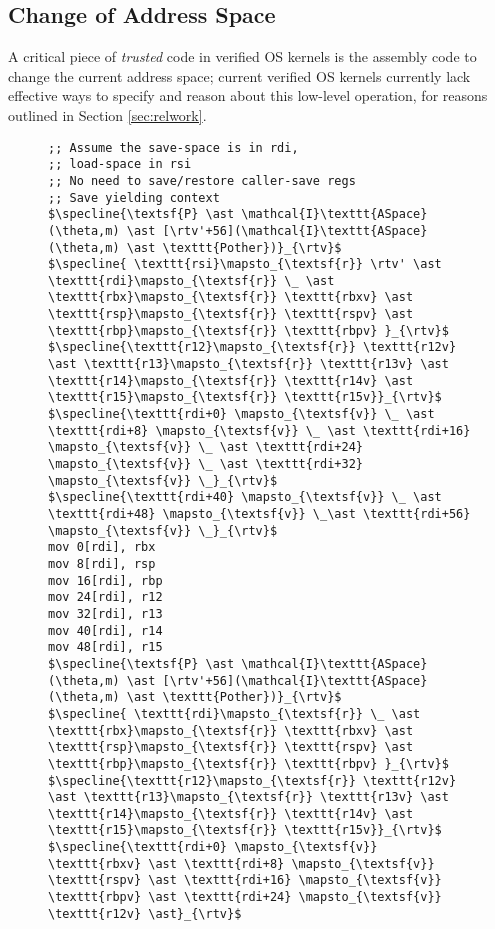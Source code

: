 \subsection{Change of Address Space}
A critical piece of \emph{trusted} code in verified OS kernels is the assembly code to change the current address space; current verified OS kernels currently lack effective ways to specify and reason about this low-level operation, for reasons outlined in Section \ref{sec:relwork}.
\begin{figure}\footnotesize
\begin{lstlisting}[mathescape]
;; Assume the save-space is in rdi,
;; load-space in rsi
;; No need to save/restore caller-save regs
;; Save yielding context
$\specline{\textsf{P} \ast \mathcal{I}\texttt{ASpace}(\theta,m) \ast [\rtv'+56](\mathcal{I}\texttt{ASpace}(\theta,m) \ast \texttt{Pother})}_{\rtv}$
$\specline{ \texttt{rsi}\mapsto_{\textsf{r}} \rtv' \ast \texttt{rdi}\mapsto_{\textsf{r}} \_ \ast \texttt{rbx}\mapsto_{\textsf{r}} \texttt{rbxv} \ast  \texttt{rsp}\mapsto_{\textsf{r}} \texttt{rspv} \ast \texttt{rbp}\mapsto_{\textsf{r}} \texttt{rbpv} }_{\rtv}$
$\specline{\texttt{r12}\mapsto_{\textsf{r}} \texttt{r12v} \ast \texttt{r13}\mapsto_{\textsf{r}} \texttt{r13v} \ast \texttt{r14}\mapsto_{\textsf{r}} \texttt{r14v} \ast \texttt{r15}\mapsto_{\textsf{r}} \texttt{r15v}}_{\rtv}$
$\specline{\texttt{rdi+0} \mapsto_{\textsf{v}} \_ \ast \texttt{rdi+8} \mapsto_{\textsf{v}} \_ \ast \texttt{rdi+16} \mapsto_{\textsf{v}} \_ \ast \texttt{rdi+24} \mapsto_{\textsf{v}} \_ \ast \texttt{rdi+32} \mapsto_{\textsf{v}} \_}_{\rtv}$
$\specline{\texttt{rdi+40} \mapsto_{\textsf{v}} \_ \ast \texttt{rdi+48} \mapsto_{\textsf{v}} \_\ast \texttt{rdi+56} \mapsto_{\textsf{v}} \_}_{\rtv}$
mov 0[rdi], rbx
mov 8[rdi], rsp
mov 16[rdi], rbp
mov 24[rdi], r12
mov 32[rdi], r13
mov 40[rdi], r14
mov 48[rdi], r15
$\specline{\textsf{P} \ast \mathcal{I}\texttt{ASpace}(\theta,m) \ast [\rtv'+56](\mathcal{I}\texttt{ASpace}(\theta,m) \ast \texttt{Pother})}_{\rtv}$
$\specline{ \texttt{rdi}\mapsto_{\textsf{r}} \_ \ast \texttt{rbx}\mapsto_{\textsf{r}} \texttt{rbxv} \ast  \texttt{rsp}\mapsto_{\textsf{r}} \texttt{rspv} \ast \texttt{rbp}\mapsto_{\textsf{r}} \texttt{rbpv} }_{\rtv}$
$\specline{\texttt{r12}\mapsto_{\textsf{r}} \texttt{r12v} \ast \texttt{r13}\mapsto_{\textsf{r}} \texttt{r13v} \ast \texttt{r14}\mapsto_{\textsf{r}} \texttt{r14v} \ast \texttt{r15}\mapsto_{\textsf{r}} \texttt{r15v}}_{\rtv}$
$\specline{\texttt{rdi+0} \mapsto_{\textsf{v}} \texttt{rbxv} \ast \texttt{rdi+8} \mapsto_{\textsf{v}} \texttt{rspv} \ast \texttt{rdi+16} \mapsto_{\textsf{v}} \texttt{rbpv} \ast \texttt{rdi+24} \mapsto_{\textsf{v}} \texttt{r12v} \ast}_{\rtv}$

\end{lstlisting}
\end{figure}
